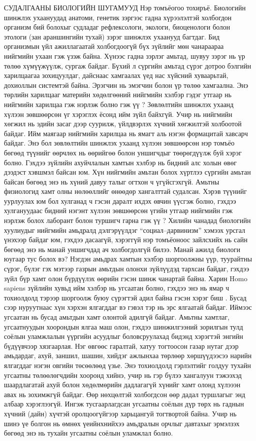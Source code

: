 СУДАЛГААНЫ БИОЛОГИЙН ШУГАМУУД
Нэр томъёогоо тохиръё. Биологийн шинжлэх ухаануудад анатоми, генетик зэргээс гадна хүрээлэлтэй холбогдон организм бий болохыг судладаг рефлексологи, экологи, биоценологи болон этологи (зан араншингийн тухай) зэрэг шинжлэх ухаанууд багтдаг. Бид организмын үйл ажиллагаатай холбогдоогүй бүх зүйлийг мөн чанараараа нийгмийн ухаан гэж үзэж байна. Хүнээс гадна зэрлэг амьтад, шувуу зэрэг нь үр төлөө хүмүүжүүлж, сургаж байдаг. Бүхий л сүргийн амьтад сүрэг дотроо бэлгийн харилцаагаа зохицуулдаг, дайснаас хамгаалах үед нас хүйсний хуваарьтай, дохиоллын системтэй байна. Эрэгчин нь эмэгчин болон үр төлөө хамгаална. Энэ төрлийн харилцааг материйн хөдөлгөөний нийгмийн хэлбэр гэдэг утгаар нь нийгмийн харилцаа гэж нэрлэж болно гэж үү ? Зөвлөлтийн шинжлэх ухаанд хүлээн зөвшөөрсөн үг хэрэглэх ёсонд ийм зүйл байхгүй. Учир нь нийгмийн хөгжил нь эдийн засаг дээр суурилж, үйлдвэрлэх хүчний хөгжилтэй холбоотой байдаг. Ийм маягаар нийгмийн харилцаа нь ямагт аль нэгэн формацитай хавсарч байдаг. Энэ бол зөвлөлтийн шинжлэх ухаанд хүлээн зөвшөөрсөн нэр томъёо бөгөөд түүнийг өөрчлөх нь өөрийгөө болон уншигчдыг төөрөгдүүлж буй хэрэг болно. Гэхдээ зүйлийн ахуйчлалын хамтын хэлбэр нь бидний алс холын өвөг дээдэст хэвшмэл байсан юм. Хүн нийгмийн амьтан болох хүртлээ сүргийн амьтан байсан бөгөөд энэ нь хүний давуу талыг огтхон ч үгүйсгэхгүй.
Амьтны физиологид хамт олны нөлөөллийг өнөөдөр хангалттай судалсан. Хэрэв түүнийг уурлуулах юм бол хулганад ч гэсэн даралт ихдэх өвчин үүсгэж болно, гэхдээ хулгануудаас бидний нэгэнт хүлээн зөвшөөрсөн үгийн утгаар нийгмийн гэж нэрлэж болох лаборант болон туршигч гарна гэж үү ? Хилийн чанадад биологийн хуулиудыг нийгмийн амьдралд дэлгэрүүлдэг “социал–дарвинизм” хэмээх урсгал үнэхээр байдаг юм, гэхдээ дасаагүй, хэрэггүй нэр томъёоноос зайлсхийх нь сайн бөгөөд энэ нь манай уншигчдад ач холбогдолгүй билээ.
Манай ажилд биологи юугаар тус болох вэ? Нэгдэн амьдрах хамтын хэлбэр шоргоолжны үүр, туурайтны сүрэг, бүлэг гэх мэтээр газрын амьтдын олонхи зүйлүүдэд тархсан байдаг, гэхдээ зүйл бүр хамт олон бүрдүүлэх өөрийн гэсэн шинж чанартай байна. Харин Homo sapiens зүйлийн хувьд ийм хэлбэр нь угсаатан болно, гэхдээ энэ нь ямар ч тохиолдолд тэрээр шоргоолж буюу сүрэгтэй адил байна гэсэн хэрэг биш . Бусад сээр нуруутнаас хүн хэрхэн ялгагддаг вэ гэвэл тэр нь эрс ялгаатай байдаг. Иймээс угсаатан нь бусад амьтдын хамт олонтой адилгүй байдаг.
Амьтны хамтлаг, угсаатнуудын хоорондын ялгаа маш олон, гэхдээ шинжилгээний зорилгын тулд соёлын уламжлалын үүргийн асуудлыг боловсруулахад бидэнд хэрэгтэй энгийн бүдүүвчээр хязгаарлая. Нэг өвгөөс гаралтай, хатуу тогтоосон газар нутаг дээр амьдардаг, ахуй, заншил, шашин, хийдэг ажлынхаа төрлөөр хөршүүдээсээ нарийн ялгагддаг нэгэн овгийн төсөөлөөд үзье. Энэ тохиолдолд гэрлэлтийг голдуу тухайн угсаатны төлөөлөгчдийн хооронд хийнэ, учир нь гэр бүлээ хангалуун тэжээхэд шаардлагатай ахуй болон хөдөлмөрийн дадлагагүй хүнийг хамт олонд хүлэээн авах нь зохимжгүй байдаг. Өөр нөхцөлтэй холбогдсон өөр дадал туршлагыг энд албаар хэрэглээгүй. Ингэж тусгаарлагдсан угсаатны соёлын дүр төрх нь гаднын хүчний (дайн) хүчтэй оролцоогүйгээр харьцангуй тогтвортой байна. Учир нь шинэ үе болгон нь өмнөх үеийнхнийхээ амьдралын орчлыг давтахыг эрмэлзэх бөгөөд энэ нь тухайн угсаатны соёлын уламжлал болно.

